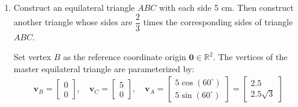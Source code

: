 \begin{enumerate}[label=\thesubsection.\arabic*, ref=\thesubsection.\theenumi]
	The points to be plotted on the Cartesian plane with the upper class limits on the horizontal axis ($x$-axis) and the cumulative frequencies on the vertical axis ($y$-axis) are:
	\begin{align*}
		(30, 0), \, (40, 7), \, (50, 12), \, (60, 20), \, (70, 30), \, (80, 36), \, (90, 42), \, (100, 50)
	\end{align*}
	
	CURVE NEED TO BE ADDED BY PYTHON CODE
	
	
	
	Here, the total number of observations is $N = 50$:
	\begin{align*}
		\frac{N}{2} = \frac{50}{2} = 25
	\end{align*}
	
	Locate $25$ on the $y$-axis (cumulative frequency axis). From this point, draw a horizontal line parallel to the $x$-axis intersecting the ogive curve. From the intersection point, drop a vertical perpendicular line to the $x$-axis.
	
	The abscissa of this point on the $x$-axis gives the median:
	\begin{align*}
		\text{Median} = 65
	\end{align*}
 
	
	\item Construct an equilateral triangle $ABC$ with each
	side 5 cm. Then construct another triangle whose sides are
	$\dfrac{2}{3}$ times the corresponding sides of triangle
	$ABC$.
	
	\solution
	Set vertex $B$ as the reference coordinate origin $\mathbf{0} \in \mathbb{R}^2$. The vertices of the master equilateral triangle are parameterized by:
	\begin{align*}
		\mathbf{v}_B = \begin{bmatrix} 0 \\ 0 \end{bmatrix}, \quad
		\mathbf{v}_C = \begin{bmatrix} 5 \\ 0 \end{bmatrix}, \quad
		\mathbf{v}_A = \begin{bmatrix} 5\cos(60^\circ) \\ 5\sin(60^\circ) \end{bmatrix} = \begin{bmatrix} 2.5 \\ 2.5\sqrt{3} \end{bmatrix}
	\end{align*}
	

\end{enumerate}
